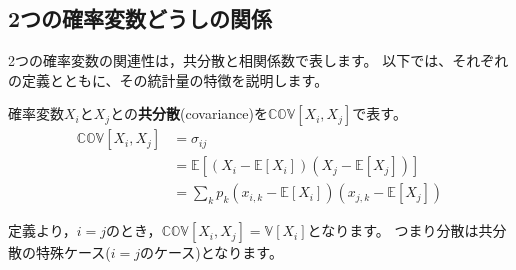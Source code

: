 \documentclass[
  letterpaper,
  pandoc,
  ja=standard,
  jafont = hiragino-pron]{ltjsbook}
\begin{document}
\subsection{2つの確率変数どうしの関係}\label{ux3064ux306eux78baux7387ux5909ux6570ux3069ux3046ux3057ux306eux95a2ux4fc2}

2つの確率変数の関連性は，共分散と相関係数で表します。
以下では、それぞれの定義とともに、その統計量の特徴を説明します。

\begin{tcolorbox}[enhanced jigsaw, colframe=quarto-callout-important-color-frame, breakable, rightrule=.15mm, coltitle=black, title=\textcolor{quarto-callout-important-color}{\faExclamation}\hspace{0.5em}{共分散}, colbacktitle=quarto-callout-important-color!10!white, leftrule=.75mm, colback=white, left=2mm, arc=.35mm, opacityback=0, titlerule=0mm, toptitle=1mm, bottomtitle=1mm, bottomrule=.15mm, toprule=.15mm, opacitybacktitle=0.6]

確率変数\(X_i\)と\(X_j\)との\textbf{共分散}(covariance)を\(\mathbb{COV}[X_i,X_j]\)で表す。
\[
\begin{aligned}
\mathbb{COV} [X_i,X_j] &= \sigma _{ij} \\
&= \mathbb{E} \left[ (X_i - \mathbb{E}[X_i])(X_j - \mathbb{E}[X_j]) \right]\\
&= \sum _k p_k (x_{i,k} - \mathbb{E} [X_i])(x_{j,k} - \mathbb{E} [X_j])
\end{aligned}
\]

\end{tcolorbox}

定義より，\(i=j\)のとき，\(\mathbb{COV} [X_i,X_j] = \mathbb{V}[X_i]\)となります。
つまり分散は共分散の特殊ケース(\(i=j\)のケース)となります。
\end{document}
